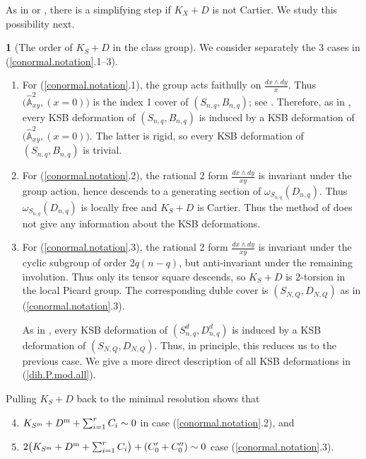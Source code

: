 \documentclass{amsart}
\theoremstyle{definition}
\newtheorem{say}[thm]{}
\theoremstyle{remark}
\renewcommand{\a}[0]{\hat{\mathbb A}}
\begin{document}
As in  \cite{ksb} or \cite[2.23]{k-modbook}, there is a simplifying step if
$K_{X}+D$ is not Cartier. We study this possibility next.



\begin{say}[The order of $K_S+D$ in the class group]\label{ord.of.K+C.say}
  We consider separately the  3
  cases in  (\ref{conormal.notation}.1--3).
\begin{enumerate}
\item  For (\ref{conormal.notation}.1), the group acts faithully on 
$\frac{dx\wedge dy}{x}$. Thus  $(\a^2_{xy}, (x=0)\bigr)$ is the index 1 cover of $(S_{n,q}, B_{n,q})$; see \cite[2.49]{kk-singbook}. Therefore, as in \cite[2.23]{k-modbook},
every KSB deformation of $(S_{n,q}, B_{n,q})$ is induced by a KSB deformation of  $(\a^2_{xy}, (x=0)\bigr)$. The latter is rigid, so every
KSB deformation of $(S_{n,q}, B_{n,q})$ is trivial.
\item  For (\ref{conormal.notation}.2),
  the rational 2 form
  $\frac{dx\wedge dy}{xy}$ is invariant under the group action, hence descends to a generating section of  $\omega_{S_{n,q}}(D_{n,q})$.  Thus
  $\omega_{S_{n,q}}(D_{n,q})$ is locally free and $K_S+D$ is Cartier.
  Thus the method of \cite[2.23]{k-modbook} does not give any information about the  KSB deformations.

  
  
  
\item  For (\ref{conormal.notation}.3),  the rational 2 form
  $\frac{dx\wedge dy}{xy}$ is invariant under the cyclic subgroup of order $2q(n-q)$, but anti-invariant under the remaining involution. Thus only its tensor square descends, so
  $K_S+D$ is 2-torsion in the local Picard group.
  The corresponding duble cover is $(S_{N,Q}, D_{N,Q})$ as in (\ref{conormal.notation}.3).

  As in \cite[2.23]{k-modbook},
  every KSB deformation of $(S^d_{n,q}, D^d_{n,q})$ is induced by a KSB deformation of  $(S_{N,Q}, D_{N,Q})$. Thus, in principle, this reduces us to the previous case. We give a more direct description of all KSB deformations in (\ref{dih.P.mod.all}).
 
\end{enumerate}

Pulling $K_S+D$ back to the minimal resolution shows that
\begin{enumerate}\setcounter{enumi}{3}
 \item  $K_{S^{\rm m}}+D^{\rm m}+\sum_{i=1}^r C_i\sim 0$ in case (\ref{conormal.notation}.2), and
\item   $2\bigl(K_{S^{\rm m}}+D^{\rm m}+\sum_{i=1}^r C_i\bigr)+(C'_0+C''_0) \sim 0$  case (\ref{conormal.notation}.3).  
\end{enumerate}
\end{say}
\end{document}
